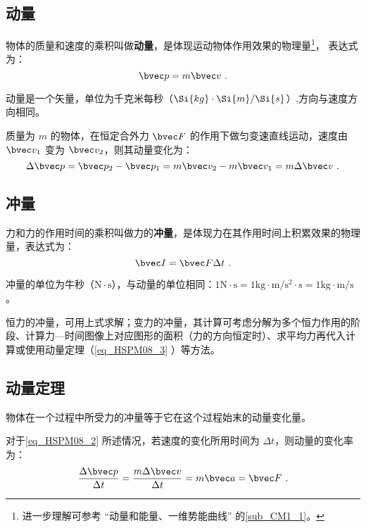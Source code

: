 

\subsection{动量}

物体的质量和速度的乘积叫做\textbf{动量}，是体现运动物体作用效果的物理量\footnote{进一步理解可参考 “动量和能量、一维势能曲线” 的\autoref{sub_CM1_1}。}， 表达式为：
\begin{equation}
\bvec p = m\bvec v~.
\end{equation}

动量是一个矢量，单位为千克米每秒（$\Si{kg} \cdot \Si{m}/\Si{s}$）,方向与速度方向相同。

质量为 $m$ 的物体，在恒定合外力 $\bvec F $ 的作用下做匀变速直线运动，速度由 $\bvec v_1$ 变为 $\bvec v_2$，则其动量变化为：
\begin{equation}\label{eq_HSPM08_2}
\Delta \bvec p =\bvec p_2 - \bvec p_1 = m\bvec v_2 - m\bvec v_1 = m\Delta \bvec v~.
\end{equation}

\subsection{冲量}

力和力的作用时间的乘积叫做力的\textbf{冲量}，是体现力在其作用时间上积累效果的物理量，表达式为：
\begin{equation}
\bvec I=\bvec F \Delta t~.
\end{equation}

冲量的单位为牛秒（$\mathrm{N\cdot s}$），与动量的单位相同：$1\mathrm{N\cdot s}=1\mathrm{kg\cdot m/s^2 \cdot s}=1\mathrm{kg\cdot m/s}$。

恒力的冲量，可用上式求解；变力的冲量，其计算可考虑分解为多个恒力作用的阶段、计算力—时间图像上对应图形的面积（力的方向恒定时）、求平均力再代入计算或使用动量定理（\autoref{eq_HSPM08_3}  ）等方法。

\subsection{动量定理}

物体在一个过程中所受力的冲量等于它在这个过程始末的动量变化量。

对于\autoref{eq_HSPM08_2} 所述情况，若速度的变化所用时间为 $\Delta t$，则动量的变化率为：
\begin{equation}\label{eq_HSPM08_1}
\frac{\Delta \bvec p}{\Delta t}=\frac{m\Delta \bvec v}{\Delta t}=m\bvec a=\bvec F~.
\end{equation}

